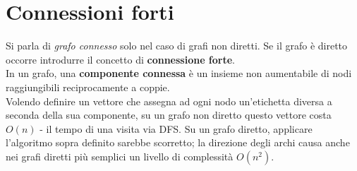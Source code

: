 \section{Connessioni forti}
Si parla di \textit{grafo connesso} solo nel caso di grafi non diretti. Se il grafo è diretto occorre introdurre il concetto di \textbf{connessione forte}. \\
In un grafo, una \textbf{componente connessa} è un insieme non aumentabile di nodi raggiungibili reciprocamente a coppie. \\
Volendo definire un vettore che assegna ad ogni nodo un'etichetta diversa a seconda della sua componente, su un grafo non diretto questo vettore costa $ O(n) $ - il tempo di una visita via DFS.
Su un grafo diretto, applicare l'algoritmo sopra definito sarebbe scorretto; la direzione degli archi causa anche nei grafi diretti più semplici un livello di complessità $ O(n^2) $.
